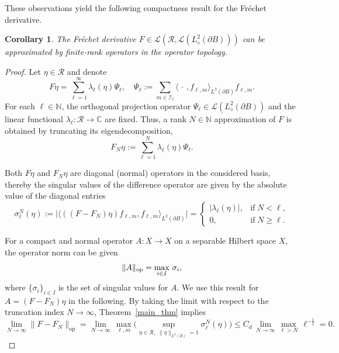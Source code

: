 \documentclass[reqno]{amsart}
\numberwithin{equation}{section}
\numberwithin{figure}{section}
\numberwithin{table}{section}
\theoremstyle{plain}
\newtheorem{corollary}[theorem]{Corollary}
\theoremstyle{definition}
\theoremstyle{remark}
\newcommand{\abs}[1]{\lvert#1\rvert}
\newcommand{\inner}[1]{\langle#1\rangle}
\newcommand{\N}{\mathbb{N}}
\newcommand{\C}{\mathbb{C}}
\newcommand{\sphe}{{\partial B}}
\begin{document}
These observations yield the following compactness result for the Fr\'echet derivative.
%
\begin{corollary} \label{main:corollary}
    The Fr\'echet derivative \( F \in \mathscr{L}\left( \mathcal{R}, \mathscr{L}(L^2_\diamond(\sphe)) \right) \) can be approximated by finite-rank operators in the operator topology.
\end{corollary}
%
\begin{proof}
    Let \( \eta \in \mathcal{R} \) and denote
    \begin{equation*}
        F \eta = \sum^\infty_{\ell=1} \lambda_\ell(\eta) \Psi_{\ell}, \quad \Psi_{\ell} := \sum_{m \in \mathcal{I_\ell}} \inner{\,\cdot\,, f_{\ell, m}}_{L^2(\sphe)} f_{\ell, m}.
    \end{equation*}
    For each \( \ell \in \N \), the orthogonal projection operator \( \Psi_{\ell} \in \mathscr{L}(L^2_\diamond(\sphe)) \) and the linear functional \( \lambda_\ell: \mathcal{R} \to \C \) are fixed.
    Thus, a rank \( N \in \N \) approximation of \( F \) is obtained by truncating its eigendecomposition,
    \[ F_N \eta := \sum_{\ell=1}^N \lambda_\ell(\eta) \Psi_{\ell}. \]


    Both \( F \eta \) and \( F_N \eta \) are diagonal (normal) operators in the considered basis, thereby the singular values of the difference operator are given by the absolute value of the diagonal entries
    \begin{equation*}
        \sigma^N_\ell(\eta) := \abs{\inner{\left( (F - F_N) \eta\right) f_{\ell, m}, f_{\ell, m}}_{L^2(\sphe)}} =
        \begin{cases}
            \abs{\lambda_\ell(\eta)}, &\text{if} \; N < \ell, \\
            0, &\text{if} \; N \geq \ell.
        \end{cases}
    \end{equation*}


    For a compact and normal operator \( A : X \to X \) on a separable Hilbert space \( X \), the operator norm can be given
    \[ \| A \|_{\rm op} = \max_{i \in I} \, \sigma_i, \]
    where \( \{ \sigma_i \}_{i \in I} \) is the set of singular values for \( A \).
    We use this result for \( A = (F - F_N) \eta \) in the following.
    By taking the limit with respect to the truncation index \( N \to \infty \), Theorem~\ref{main_thm} implies
    \begin{equation*}
        \lim_{N \to \infty} \| F - F_N \|_{\mathrm{op}} 
        = 
        \lim_{N \to \infty} \, \max_{\ell, m} \bigg( \sup_{\eta \in \mathcal{R}, \; \| \eta \|_{L^2(B)} = 1} \sigma^N_\ell(\eta) \bigg)
        \leq 
        C_d \, \lim_{N \to \infty} \max_{\ell > N} \, \ell^{-\frac{1}{2}} = 0.
    \end{equation*}
\end{proof}
%
\end{document}
